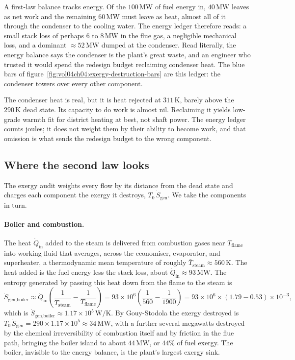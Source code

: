 A first-law balance tracks energy. Of the $100\,\text{MW}$ of fuel
energy in, $40\,\text{MW}$ leaves as net work and the remaining
$60\,\text{MW}$ must leave as heat, almost all of it through the
condenser to the cooling water. The energy ledger therefore reads: a
small stack loss of perhaps $6$ to $8\,\text{MW}$ in the flue gas, a
negligible mechanical loss, and a dominant $\approx 52\,\text{MW}$
dumped at the condenser. Read literally, the energy balance says the
condenser is the plant's great waste, and an engineer who trusted it
would spend the redesign budget reclaiming condenser heat. The blue bars
of figure~\ref{fig:vol04ch04:exergy-destruction-bars} are this ledger:
the condenser towers over every other component.

The condenser heat is real, but it is heat rejected at $311\,\si{\kelvin}$,
barely above the $290\,\si{\kelvin}$ dead state. Its capacity to do work
is almost nil. Reclaiming it yields low-grade warmth fit for district
heating at best, not shaft power. The energy ledger counts joules; it
does not weight them by their ability to become work, and that omission
is what sends the redesign budget to the wrong component.

\subsection{Where the second law looks}

The exergy audit weights every flow by its distance from the dead state
and charges each component the exergy it destroys, $T_0\,\dot S_{\text{gen}}$.
We take the components in turn.

\paragraph{Boiler and combustion.} The heat $\dot Q_{\text{in}}$ added
to the steam is delivered from combustion gases near $T_{\text{flame}}$
into working fluid that averages, across the economiser, evaporator, and
superheater, a thermodynamic mean temperature of roughly
$\bar T_{\text{steam}} \approx 560\,\si{\kelvin}$. The heat added is the
fuel energy less the stack loss, about $\dot Q_{\text{in}} \approx
93\,\text{MW}$. The entropy generated by passing this heat down from the
flame to the steam is
\[
\dot S_{\text{gen,boiler}} \approx \dot Q_{\text{in}}
\left(\frac{1}{\bar T_{\text{steam}}} - \frac{1}{T_{\text{flame}}}\right)
= 93\times 10^6\left(\frac{1}{560} - \frac{1}{1900}\right)
= 93\times 10^6 \times (1.79 - 0.53)\times 10^{-3},
\]
which is $\dot S_{\text{gen,boiler}} \approx 1.17\times 10^5\,
\si{\watt\per\kelvin}$. By Gouy-Stodola the exergy destroyed is
$T_0\,\dot S_{\text{gen}} = 290 \times 1.17\times10^5 \approx
34\,\text{MW}$, with a further several megawatts destroyed by the
chemical irreversibility of combustion itself and by friction in the
flue path, bringing the boiler island to about $44\,\text{MW}$, or
$44\%$ of fuel exergy. The boiler, invisible to the energy balance, is
the plant's largest exergy sink.

